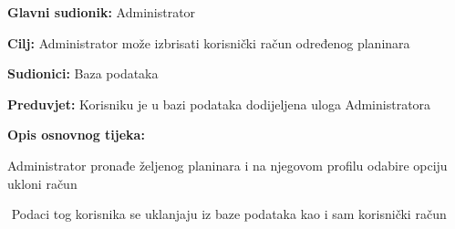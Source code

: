 	
		\noindent {}
		\begin{packed_item}
			
			\item \textbf{Glavni sudionik: }$ $Administrator$ $
			\item  \textbf{Cilj:} $ $Administrator može izbrisati korisnički račun određenog planinara $ $
			\item  \textbf{Sudionici:} $ $Baza podataka $ $
			\item  \textbf{Preduvjet:} $ $Korisniku je u bazi podataka dodijeljena uloga Administratora$ $
			\item  \textbf{Opis osnovnog tijeka:}
			
			\item[] \begin{packed_enum}
				
				\item $ $Administrator pronađe željenog planinara i na njegovom profilu odabire opciju ukloni račun$ $
				\item $ $ Podaci tog korisnika se uklanjaju iz baze podataka kao i sam korisnički račun $ $
				
				
			\end{packed_enum}
		\end{packed_item}
			\noindent {}
